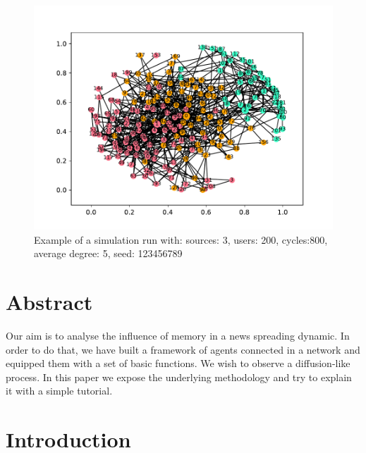 \begin{figure}[!h]
  \centering
  \includegraphics[trim={2.1cm 2cm 2cm 2cm}, clip, width=\columnwidth]{img/pdf/cover}
  \caption{Example of a simulation run with: sources: 3, users: 200, cycles:800, average degree: 5, seed: 123456789}
  \label{fig:abstract}
\end{figure}

\section*{Abstract}
Our aim is to analyse the influence of memory in a news spreading dynamic. In order to do that, we have built a framework of agents 
connected in a network and equipped them with a set of basic functions. We wish to observe a diffusion-like process.
In this paper we expose the underlying methodology and try to explain it with a simple tutorial.
\section{Introduction}

